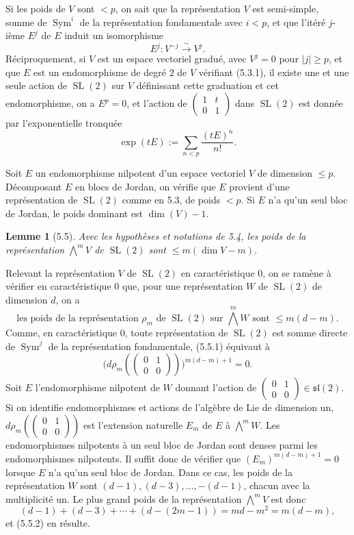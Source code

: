 \documentclass[10pt]{article}
\newcommand{\SL}{\operatorname{SL}}
\theoremstyle{deligne}
\newtheorem*{lemma*}{Lemme}
\newcommand{\heading}[1]{\vspace{0.7em}\noindent{\bfseries #1}\quad}
\begin{document}
Si les poids de \(V\) sont \(<p\), on sait que la représentation \(V\) est semi-simple, somme de \(\operatorname{Sym}^i\) de la représentation fondamentale avec \(i<p\), et que l'itéré \(j\)-ième \(E^j\) de \(E\) induit un isomorphisme
\[
\tag{5.3.1}
  E^j:V^{-j}\overset{\sim}{\longrightarrow}V^j.
\]
Réciproquement, si \(V\) est un espace vectoriel gradué, avec \(V^j=0\) pour \(|j|\ge p\), et que \(E\) est un endomorphisme de degré \(2\) de \(V\) vérifiant (5.3.1), il existe une et une seule action de \(\SL(2)\) sur \(V\) définissant cette graduation et cet endomorphisme, on a \(E^p=0\), et l'action de \(\begin{pmatrix}1&t\\0&1\end{pmatrix}\) dans \(\SL(2)\) est donnée par l'exponentielle tronquée
\[
\tag{5.3.2}
  \exp(tE):=\sum_{n<p}\frac{(tE)^n}{n!}.
\]

\heading{5.4.}
Soit \(E\) un endomorphisme nilpotent d'un espace vectoriel \(V\) de dimension \(\le p\). Décomposant \(E\) en blocs de Jordan, on vérifie que \(E\) provient d'une représentation de \(\SL(2)\) comme en 5.3, de poids \(<p\). Si \(E\) n'a qu'un seul bloc de Jordan, le poids dominant est \(\dim(V)-1\).

\begin{lemma*}[5.5]
Avec les hypothèses et notations de 5.4, les poids de la représentation \(\bigwedge^m V\) de \(\SL(2)\) sont \(\le m(\dim V-m)\).
\end{lemma*}

Relevant la représentation \(V\) de \(\SL(2)\) en caractéristique \(0\), on se ramène à vérifier en caractéristique \(0\) que, pour une représentation \(W\) de \(\SL(2)\) de dimension \(d\), on a
\[
\tag{5.5.1}
  \text{les poids de la représentation }\rho_m\text{ de }\SL(2)\text{ sur }\bigwedge^m W\text{ sont }\le m(d-m).
\]
Comme, en caractéristique \(0\), toute représentation de \(\SL(2)\) est somme directe de \(\operatorname{Sym}^j\) de la représentation fondamentale, (5.5.1) équivaut à
\[
\tag{5.5.2}
  \bigl(d\rho_m(\begin{pmatrix}0&1\\0&0\end{pmatrix})\bigr)^{m(d-m)+1}=0.
\]
Soit \(E\) l'endomorphisme nilpotent de \(W\) donnant l'action de \(\begin{pmatrix}0&1\\0&0\end{pmatrix}\in\mathfrak{sl}(2)\). Si on identifie endomorphismes et actions de l'algèbre de Lie de dimension un, \(d\rho_m(\begin{pmatrix}0&1\\0&0\end{pmatrix})\) est l'extension naturelle \(E_m\) de \(E\) à \(\bigwedge^m W\). Les endomorphismes nilpotents à un seul bloc de Jordan sont denses parmi les endomorphismes nilpotents. Il suffit donc de vérifier que \((E_m)^{m(d-m)+1}=0\) lorsque \(E\) n'a qu'un seul bloc de Jordan. Dans ce cas, les poids de la représentation \(W\) sont \((d-1),(d-3),\ldots,-(d-1)\), chacun avec la multiplicité un. Le plus grand poids de la représentation \(\bigwedge^m V\) est donc
\[
  (d-1)+(d-3)+\cdots+(d-(2m-1))=md-m^2=m(d-m),
\]
et (5.5.2) en résulte.
\end{document}
